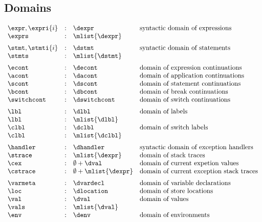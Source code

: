 \documentclass{article}
\begin{document}
\subsection{Domains}
\label{subsec:domains}
\[
  \begin{array}{lcll}
	\expr, \expri{i} & : & \dexpr & \textrm{syntactic domain of expressions}\\
	\exprs & : & \mlist{\dexpr}\\[2mm]

	\stmt, \stmti{i} & : & \dstmt & \textrm{syntactic domain of statements}\\
	\stmts & : & \mlist{\dstmt}  & \textrm{}\\[2mm]

	\econt & : & \decont & \textrm{domain of expression continuations}\\
	\acont & : & \dacont & \textrm{domain of application continuations}\\
	\scont & : & \dscont & \textrm{domain of statement continuations}\\
	\bcont & : & \dbcont & \textrm{domain of break continuations}\\
	\switchcont & : & \dswitchcont & \textrm{domain of switch continuations}\\[2mm]

	\lbl & : & \dlbl & \textrm{domain of labels}\\
	\lbl & : & \mlist{\dlbl} \\
	\clbl & : & \dclbl & \textrm{domain of switch labels}\\
	\clbl & : & \mlist{\dclbl} \\[2mm]

	\handler & : & \dhandler & \textrm{syntactic domain of exception handlers} \\
	\strace & : & \mlist{\dexpr} & \textrm{domain of stack traces}\\
	\cex & : &  \emptyset + \dval & \textrm{domain of current expetion values}\\
	\cstrace & : & \emptyset + \mlist{\dexpr} & \textrm{domain of current exception stack traces}\\[2mm]

	\varmeta & : & \dvardecl & \textrm{domain of variable declarations}\\
	\loc & : & \dlocation & \textrm{domain of store locations}\\
	\val & : & \dval & \textrm{domain of values}\\
	\vals & : & \mlist{\dval}\\
	\env & : & \denv & \textrm{domain of environments}

  \end{array}
\]
\end{document}
